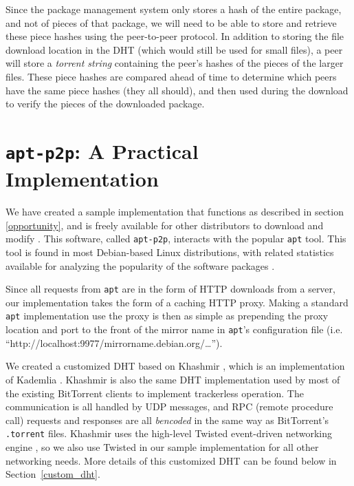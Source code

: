 \documentclass[conference]{IEEEtran}
\begin{document}
Since the package management system only stores a hash of the entire
package, and not of pieces of that package, we will need to be able
to store and retrieve these piece hashes using the peer-to-peer protocol. In
addition to storing the file download location in the DHT (which
would still be used for small files), a peer will store a
\emph{torrent string} containing the peer's hashes of the pieces of
the larger files. These piece hashes are compared ahead of time
to determine which peers have the same piece hashes (they all
should), and then used during the download to verify the pieces of
the downloaded package.


\section{\texttt{apt-p2p}: A Practical Implementation}
\label{implementation}

We have created a sample implementation that functions as described
in section \ref{opportunity}, and is freely available for other
distributors to download and modify \cite{apt-p2p}. This software,
called \texttt{apt-p2p}, interacts with the popular \texttt{apt} tool. This tool 
is found in most Debian-based Linux distributions, with related statistics
available for analyzing the popularity of the software packages
\cite{popcon}.

Since all requests from \texttt{apt} are in the form of HTTP downloads from a
server, our implementation takes the form of a caching HTTP proxy.
Making a standard \texttt{apt} implementation use the proxy is then
as simple as prepending the proxy location and port to the front of
the mirror name in \texttt{apt}'s configuration file (i.e.
``http://localhost:9977/mirrorname.debian.org/\ldots'').

We created a customized DHT based on Khashmir \cite{khashmir}, which
is an implementation of Kademlia \cite{kademlia}. Khashmir is also the same DHT
implementation used by most of the existing BitTorrent clients to
implement trackerless operation. The communication is all handled by
UDP messages, and RPC (remote procedure call) requests and responses
are all \emph{bencoded} in the same way as BitTorrent's
\texttt{.torrent} files. Khashmir uses the high-level Twisted
event-driven networking engine \cite{twisted}, so we also use
Twisted in our sample implementation for all other networking needs.
More details of this customized DHT can be found below in
Section~\ref{custom_dht}.
\end{document}
